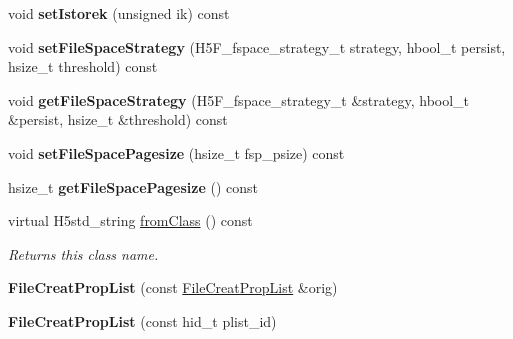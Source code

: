 \begin{DoxyCompactItemize}
void {\bfseries set\+Istorek} (unsigned ik) const
\item 
\mbox{\label{class_h5_1_1_file_creat_prop_list_ad61e21236cf84a827fbb852e747f046e}} 
void {\bfseries set\+File\+Space\+Strategy} (H5\+F\+\_\+fspace\+\_\+strategy\+\_\+t strategy, hbool\+\_\+t persist, hsize\+\_\+t threshold) const
\item 
\mbox{\label{class_h5_1_1_file_creat_prop_list_a1098105f1335c5059ba067193aa5fa2d}} 
void {\bfseries get\+File\+Space\+Strategy} (H5\+F\+\_\+fspace\+\_\+strategy\+\_\+t \&strategy, hbool\+\_\+t \&persist, hsize\+\_\+t \&threshold) const
\item 
\mbox{\label{class_h5_1_1_file_creat_prop_list_a4029784c6a812e170d52d12086dd510a}} 
void {\bfseries set\+File\+Space\+Pagesize} (hsize\+\_\+t fsp\+\_\+psize) const
\item 
\mbox{\label{class_h5_1_1_file_creat_prop_list_aa733fb6b10c11899514cdbb1ac3f825c}} 
hsize\+\_\+t {\bfseries get\+File\+Space\+Pagesize} () const
\item 
\mbox{\label{class_h5_1_1_file_creat_prop_list_a5ae21c5253e8405e8bf0e58ac203b41d}} 
virtual H5std\+\_\+string \hyperlink{class_h5_1_1_file_creat_prop_list_a5ae21c5253e8405e8bf0e58ac203b41d}{from\+Class} () const
\begin{DoxyCompactList}\small\item\em Returns this class name. \end{DoxyCompactList}\item 
\mbox{\label{class_h5_1_1_file_creat_prop_list_a266c0a7238a31abdb2822a24207ffad9}} 
{\bfseries File\+Creat\+Prop\+List} (const \hyperlink{class_h5_1_1_file_creat_prop_list}{File\+Creat\+Prop\+List} \&orig)
\item 
\mbox{\label{class_h5_1_1_file_creat_prop_list_a9bdce8e0eb3f47f633cb96cf81af1f84}} 
{\bfseries File\+Creat\+Prop\+List} (const hid\+\_\+t plist\+\_\+id)
\end{DoxyCompactItemize}
